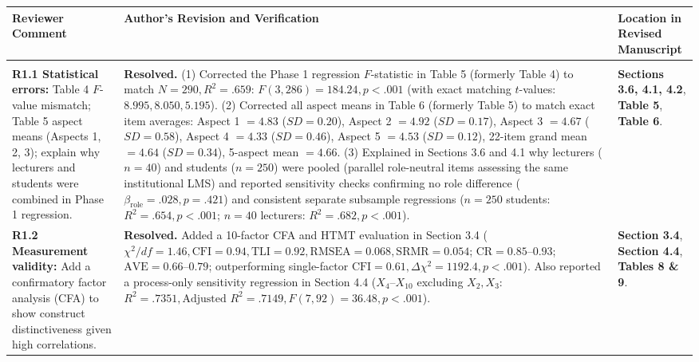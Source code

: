\documentclass[11pt, a4paper]{article}
\begin{document}
\small
\begin{longtable}{@{} >{\raggedright\arraybackslash}p{3.9cm} >{\raggedright\arraybackslash}p{8.8cm} >{\raggedright\arraybackslash}p{2.9cm} @{}}
\toprule
\textbf{Reviewer Comment} & \textbf{Author's Revision and Verification} & \textbf{Location in Revised Manuscript} \tabularnewline
\midrule
\endhead

\multicolumn{3}{@{}l}{\textbf{PART 1: RESPONSES TO REVIEWER 1}} \tabularnewline
\midrule

\textbf{R1.1 Statistical errors:} Table 4 $F$-value mismatch; Table 5 aspect means (Aspects 1, 2, 3); explain why lecturers and students were combined in Phase 1 regression. 
& 
\textbf{Resolved.} (1) Corrected the Phase 1 regression $F$-statistic in Table 5 (formerly Table 4) to match $N = 290, R^2 = .659$: $F(3, 286) = 184.24, p < .001$ (with exact matching $t$-values: $8.995, 8.050, 5.195$). (2) Corrected all aspect means in Table 6 (formerly Table 5) to match exact item averages: Aspect 1 $= 4.83$ ($SD = 0.20$), Aspect 2 $= 4.92$ ($SD = 0.17$), Aspect 3 $= 4.67$ ($SD = 0.58$), Aspect 4 $= 4.33$ ($SD = 0.46$), Aspect 5 $= 4.53$ ($SD = 0.12$), 22-item grand mean $= 4.64$ ($SD = 0.34$), 5-aspect mean $= 4.66$. (3) Explained in Sections 3.6 and 4.1 why lecturers ($n = 40$) and students ($n = 250$) were pooled (parallel role-neutral items assessing the same institutional LMS) and reported sensitivity checks confirming no role difference ($\beta_{\text{role}} = .028, p = .421$) and consistent separate subsample regressions ($n = 250$ students: $R^2 = .654, p < .001$; $n = 40$ lecturers: $R^2 = .682, p < .001$).
& 
\textbf{Sections 3.6, 4.1, 4.2}, \newline \textbf{Table 5}, \newline \textbf{Table 6}. \tabularnewline
\midrule

\textbf{R1.2 Measurement validity:} Add a confirmatory factor analysis (CFA) to show construct distinctiveness given high correlations. 
& 
\textbf{Resolved.} Added a 10-factor CFA and HTMT evaluation in Section 3.4 ($\chi^2/df = 1.46, \text{CFI} = 0.94, \text{TLI} = 0.92, \text{RMSEA} = 0.068, \text{SRMR} = 0.054$; $\text{CR} = 0.85\text{--}0.93$; $\text{AVE} = 0.66\text{--}0.79$; outperforming single-factor $\text{CFI} = 0.61, \Delta\chi^2 = 1192.4, p < .001$). Also reported a process-only sensitivity regression in Section 4.4 ($X_4\text{--}X_{10}$ excluding $X_2, X_3$: $R^2 = .7351, \text{Adjusted } R^2 = .7149, F(7, 92) = 36.48, p < .001$).
& 
\textbf{Section 3.4}, \newline \textbf{Section 4.4}, \newline \textbf{Tables 8 \& 9}. \tabularnewline
\midrule


\end{longtable}
\end{document}
